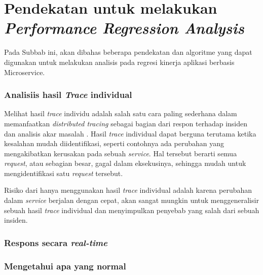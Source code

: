\section{Pendekatan untuk melakukan \textit{Performance Regression Analysis}}
Pada Subbab ini, akan dibahas beberapa pendekatan dan algoritme yang dapat digunakan untuk melakukan analisis pada regresi kinerja aplikasi berbasis Microservice.
\label{ch2-algo}


\subsubsection{Analisiis hasil \textit{Trace} individual}
Melihat hasil \textit{trace} individu adalah salah satu cara paling sederhana dalam memanfaatkan \textit{distributed tracing} sebagai bagian dari respon terhadap insiden dan analisis akar masalah \citep{parker2020distributed}. Hasil \textit{trace} individual dapat berguna terutama ketika kesalahan mudah diidentifikasi, seperti contohnya ada perubahan yang mengakibatkan kerusakan pada sebuah \textit{service}. Hal tersebut berarti semua \textit{request}, atau sebagian besar, gagal dalam eksekusinya, sehingga mudah untuk mengidentifikasi satu \textit{request} tersebut.

Risiko dari hanya menggunakan hasil \textit{trace} individual adalah karena perubahan dalam \textit{service} berjalan dengan cepat, akan sangat mungkin untuk menggeneralisir sebuah hasil \textit{trace} individual dan menyimpulkan penyebab yang salah dari sebuah insiden. 




\subsubsection{Respons secara \textit{real-time}}
\label{approach-realtime}


\subsubsection{Mengetahui apa yang normal}
\label{approach-normal}


